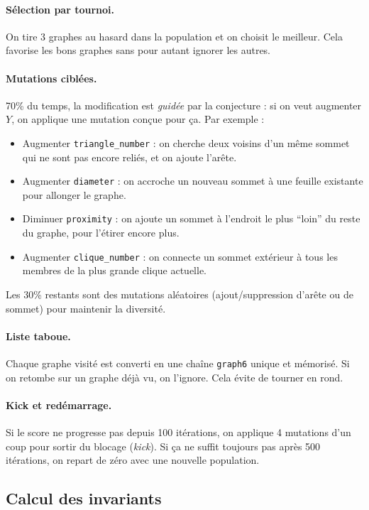 \documentclass[12pt,a4paper]{article}
\begin{document}
\paragraph{Sélection par tournoi.}
On tire 3 graphes au hasard dans la population et on choisit le meilleur.
Cela favorise les bons graphes sans pour autant ignorer les autres.

\paragraph{Mutations ciblées.}
70\% du temps, la modification est \emph{guidée} par la conjecture : si on veut
augmenter $Y$, on applique une mutation conçue pour ça.  Par exemple :
\begin{itemize}
  \item Augmenter \texttt{triangle\_number} : on cherche deux voisins d'un
        même sommet qui ne sont pas encore reliés, et on ajoute l'arête.
  \item Augmenter \texttt{diameter} : on accroche un nouveau sommet à une
        feuille existante pour allonger le graphe.
  \item Diminuer \texttt{proximity} : on ajoute un sommet à l'endroit le plus
        ``loin'' du reste du graphe, pour l'étirer encore plus.
  \item Augmenter \texttt{clique\_number} : on connecte un sommet extérieur
        à tous les membres de la plus grande clique actuelle.
\end{itemize}
Les 30\% restants sont des mutations aléatoires (ajout/suppression d'arête ou de sommet)
pour maintenir la diversité.

\paragraph{Liste taboue.}
Chaque graphe visité est converti en une chaîne \texttt{graph6} unique et mémorisé.
Si on retombe sur un graphe déjà vu, on l'ignore.  Cela évite de tourner en rond.

\paragraph{Kick et redémarrage.}
Si le score ne progresse pas depuis 100 itérations, on applique 4 mutations
d'un coup pour sortir du blocage (\emph{kick}).  Si ça ne suffit toujours pas
après 500 itérations, on repart de zéro avec une nouvelle population.

\subsection{Calcul des invariants}
\end{document}
